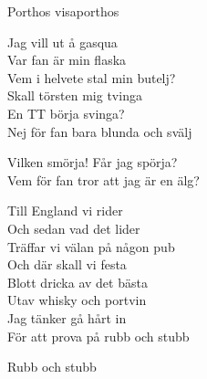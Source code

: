 \begin{song}{Porthos visa}{porthos}
\begin{vers}
Jag vill ut å gasqua\\
Var fan är min flaska\\
Vem i helvete stal min butelj?\\
Skall törsten mig tvinga\\
En TT börja svinga?\\
Nej för fan bara blunda och svälj\\
\end{vers}
\begin{vers}
Vilken smörja! Får jag spörja?\\
Vem för fan tror att jag är en älg?\\
\end{vers}
\begin{vers}
Till England vi rider\\
Och sedan vad det lider\\
Träffar vi välan på någon pub\\
Och där skall vi festa\\
Blott dricka av det bästa\\
Utav whisky och portvin\\
Jag tänker gå hårt in\\
För att prova på rubb och stubb\\
\end{vers}
\begin{vers}
\repopen Rubb och stubb \repclose\\
\end{vers}
\end{song}

